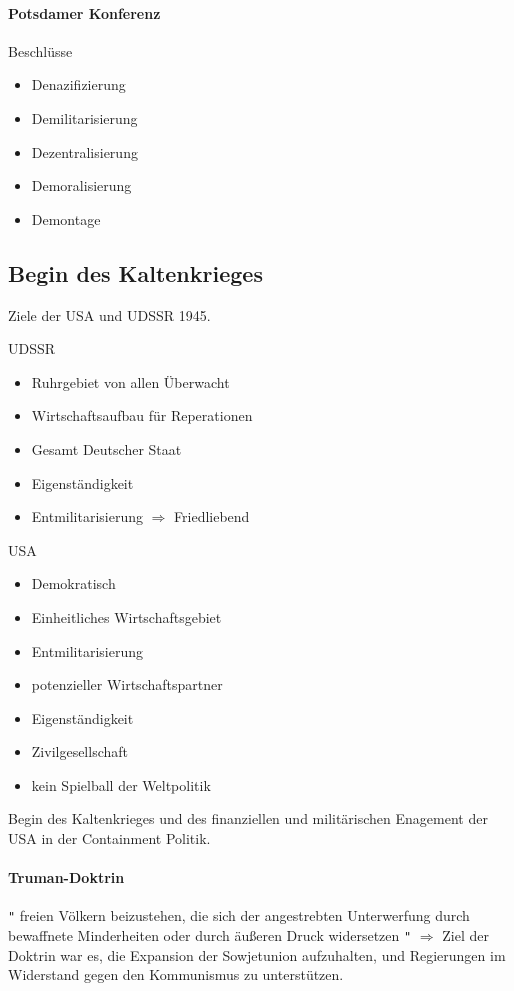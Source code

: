 \documentclass[12pt]{article}
\begin{document}
\paragraph*{Potsdamer Konferenz} Beschlüsse 

\begin{itemize}
	\item Denazifizierung
	\item Demilitarisierung
	\item Dezentralisierung
	\item Demoralisierung
	\item Demontage
\end{itemize}

\subsection*{Begin des Kaltenkrieges}

Ziele der USA und UDSSR 1945.
\begin{multicols}{2}
UDSSR
\begin{itemize}
	\item Ruhrgebiet von allen Überwacht
	\item Wirtschaftsaufbau für Reperationen
	\item Gesamt Deutscher Staat
	\item Eigenständigkeit
	\item Entmilitarisierung $ \Rightarrow $ Friedliebend
\end{itemize}

\columnbreak

USA
\begin{itemize}
	\item Demokratisch
	\item Einheitliches Wirtschaftsgebiet
	\item Entmilitarisierung
	\item potenzieller Wirtschaftspartner
	\item Eigenständigkeit
	\item Zivilgesellschaft
	\item kein Spielball der Weltpolitik

\end{itemize}

\end{multicols}

Begin des Kaltenkrieges und des finanziellen und militärischen Enagement der USA in der Containment Politik.

\paragraph*{Truman-Doktrin}
\verb|"| freien Völkern beizustehen, die sich der angestrebten Unterwerfung durch bewaffnete Minderheiten oder durch äußeren Druck widersetzen \verb|"| $\Rightarrow$ Ziel der Doktrin war es, die Expansion der Sowjetunion aufzuhalten, und Regierungen im Widerstand gegen den Kommunismus zu unterstützen. 
\end{document}
